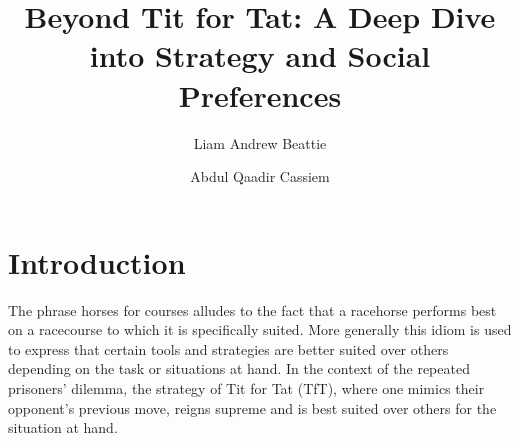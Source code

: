 \documentclass[11pt,preprint]{elsarticle}
\numberwithin{equation}{section}
\numberwithin{figure}{section}
\numberwithin{table}{section}
\begin{document}
\begin{frontmatter}  %

\title{Beyond Tit for Tat: A Deep Dive into Strategy and Social
Preferences}





\author[Add1]{Liam Andrew Beattie}

\author[Add1]{Abdul Qaadir Cassiem}




\address[Add1]{Microeconomics 871, Stellenbosch University, South
Africa}



\vspace{1cm}





\vspace{0.5cm}

\end{frontmatter}

\setcounter{footnote}{0}



\pagestyle{fancy}
\chead{}
\rhead{}
\lfoot{}
\lhead{}
\cfoot{}


\headsep 35pt %




\hypertarget{introduction}{%
\section{\texorpdfstring{Introduction
\label{Introduction}}{Introduction }}\label{introduction}}

The phrase horses for courses alludes to the fact that a racehorse
performs best on a racecourse to which it is specifically suited. More
generally this idiom is used to express that certain tools and
strategies are better suited over others depending on the task or
situations at hand. In the context of the repeated prisoners' dilemma,
the strategy of Tit for Tat (TfT), where one mimics their opponent's
previous move, reigns supreme and is best suited over others for the
situation at hand.
\end{document}
